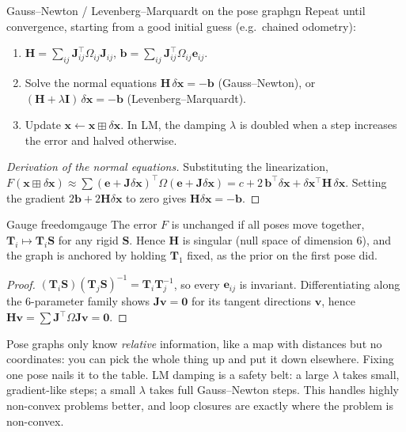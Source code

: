 \documentclass[11pt,a4paper]{article}
\newcommand{\be}{\mathbf{e}}
\newcommand{\bH}{\mathbf{H}}
\newcommand{\bb}{\mathbf{b}}
\newcommand{\bJ}{\mathbf{J}}
\newcommand{\bI}{\mathbf{I}}
\newcommand{\bT}{\mathbf{T}}
\begin{document}
\begin{algorithm}{Gauss--Newton / Levenberg--Marquardt on the pose graph}{gn}
Repeat until convergence, starting from a good initial guess (e.g.\ chained odometry):
\begin{enumerate}[nosep]
\item $\bH=\sum_{ij}\bJ_{ij}^\top\Omega_{ij}\bJ_{ij}$, \quad $\bb=\sum_{ij}\bJ_{ij}^\top\Omega_{ij}\be_{ij}$.
\item Solve the normal equations $\bH\,\delta\mathbf x=-\bb$ (Gauss--Newton), or $(\bH+\lambda\bI)\,\delta\mathbf x=-\bb$ (Levenberg--Marquardt).
\item Update $\mathbf x\leftarrow\mathbf x\boxplus\delta\mathbf x$. In LM, the damping $\lambda$ is doubled when a step increases the error and halved otherwise.
\end{enumerate}
\end{algorithm}
\begin{proof}[Derivation of the normal equations]
Substituting the linearization, $F(\mathbf x\boxplus\delta\mathbf x)\approx\sum(\be+\bJ\delta\mathbf x)^\top\Omega(\be+\bJ\delta\mathbf x)=c+2\,\bb^\top\delta\mathbf x+\delta\mathbf x^\top\bH\,\delta\mathbf x$. Setting the gradient $2\bb+2\bH\delta\mathbf x$ to zero gives $\bH\delta\mathbf x=-\bb$. \qedhere
\end{proof}

\begin{proposition}{Gauge freedom}{gauge}
The error $F$ is unchanged if all poses move together, $\bT_i\mapsto\bT_i\mathbf S$ for any rigid $\mathbf S$. Hence $\bH$ is singular (null space of dimension $6$), and the graph is anchored by holding $\bT_1$ fixed, as the prior on the first pose did.
\end{proposition}
\begin{proof}
$(\bT_i\mathbf S)(\bT_j\mathbf S)^{-1}=\bT_i\bT_j^{-1}$, so every $\be_{ij}$ is invariant. Differentiating along the 6-parameter family shows $\bJ\mathbf v=\mathbf 0$ for its tangent directions $\mathbf v$, hence $\bH\mathbf v=\sum\bJ^\top\Omega\bJ\mathbf v=\mathbf 0$. \qedhere
\end{proof}
\begin{intuition}
Pose graphs only know \emph{relative} information, like a map with distances but no coordinates: you can pick the whole thing up and put it down elsewhere. Fixing one pose nails it to the table. LM damping is a safety belt: a large $\lambda$ takes small, gradient-like steps; a small $\lambda$ takes full Gauss--Newton steps. This handles highly non-convex problems better, and loop closures are exactly where the problem is non-convex.
\end{intuition}
\end{document}

